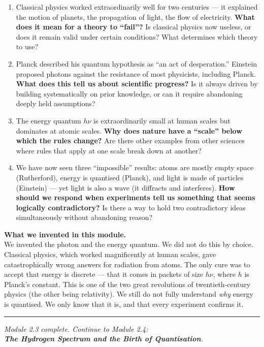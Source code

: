 \documentclass[12pt, a4paper]{book}
\begin{document}
\begin{reflectionbox}
\begin{enumerate}[label=\textbf{R\arabic*.}]
  \item Classical physics worked extraordinarily well
        for two centuries --- it explained the motion of planets,
        the propagation of light, the flow of electricity.
        \textbf{What does it mean for a theory to ``fail''?}
        Is classical physics now useless, or does it remain
        valid under certain conditions?
        What determines which theory to use?

  \item Planck described his quantum hypothesis as ``an act
        of desperation.''
        Einstein proposed photons against the resistance
        of most physicists, including Planck.
        \textbf{What does this tell us about scientific progress?}
        Is it always driven by building systematically on
        prior knowledge, or can it require abandoning
        deeply held assumptions?

  \item The energy quantum $h\nu$ is extraordinarily small
        at human scales but dominates at atomic scales.
        \textbf{Why does nature have a ``scale'' below which
        the rules change?}
        Are there other examples from other sciences where
        rules that apply at one scale break down at another?

  \item We have now seen three ``impossible'' results:
        atoms are mostly empty space (Rutherford),
        energy is quantised (Planck), and light is made
        of particles (Einstein) --- yet light is also a wave
        (it diffracts and interferes).
        \textbf{How should we respond when experiments
        tell us something that seems logically contradictory?}
        Is there a way to hold two contradictory ideas
        simultaneously without abandoning reason?
\end{enumerate}
\end{reflectionbox}

\vspace{1.5em}
\begin{center}
\begin{tcolorbox}[enhanced, colback=DiscoveryColor!8, colframe=DiscoveryColor,
  width=0.88\textwidth, arc=3pt]
\centering\sffamily\small
\textbf{What we invented in this module.}\\[4pt]
We invented the photon and the energy quantum.
We did not do this by choice.
Classical physics, which worked magnificently at human scales,
gave catastrophically wrong answers for radiation from atoms.
The only cure was to accept that energy is discrete ---
that it comes in packets of size $h\nu$, where $h$ is
Planck's constant.
This is one of the two great revolutions of twentieth-century physics
(the other being relativity).
We still do not fully understand \emph{why} energy is quantised.
We only know that it is, and that every experiment confirms it.
\end{tcolorbox}
\end{center}

\vspace{2em}
\noindent\textcolor{JourneyColor!40}{\rule{\textwidth}{0.6pt}}
\begin{center}
\textit{\sffamily\small
Module 2.3 complete. Continue to Module 2.4:\\
\textbf{The Hydrogen Spectrum and the Birth of Quantisation}.}
\end{center}
\end{document}
